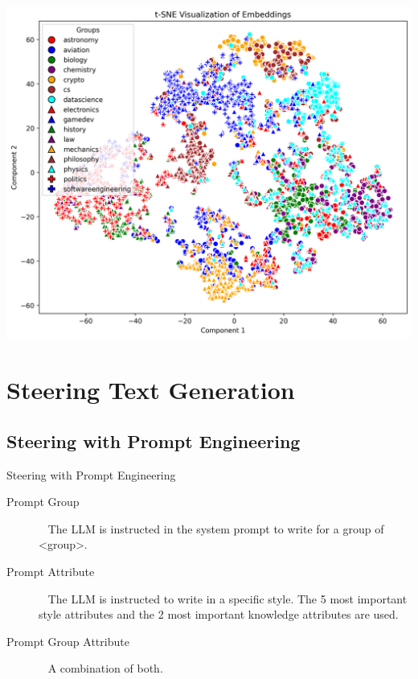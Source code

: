 \documentclass[]{beamer}
\begin{document}
\begin{frame}[plain]
  \includegraphics[width=\linewidth]{img/t-SNE-embedding.png}
\end{frame}


\section{Steering Text Generation}
\subsection{Steering with Prompt Engineering}
\begin{frame}{Steering with Prompt Engineering}
  \begin{description}
    \item[Prompt Group] ~\linebreak
          The LLM is instructed in the system prompt to write for a group of <group>.
    \item[Prompt Attribute] ~\linebreak
          The LLM is instructed to write in a specific style. The 5 most important style attributes and the 2 most important knowledge attributes are used.
    \item[Prompt Group Attribute] ~\linebreak
          A combination of both.
  \end{description}
\end{frame}
\end{document}
